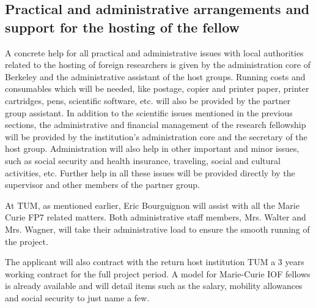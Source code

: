 \subsection{Practical and administrative arrangements and support for the hosting of the fellow 
} 
A concrete help for all practical and administrative issues with local authorities related to 
the hosting of foreign researchers is given by the administration core of Berkeley and the 
administrative assistant of the host groups. Running costs and consumables which will be needed, like 
postage, copier and printer paper, printer cartridges, pens, scientific software, etc. will 
also be provided by the partner group assistant. 
In addition to the scientific issues mentioned in the previous sections, the administrative 
and financial management of the research fellowship will be provided by the institution's 
administration core and the secretary of the host group. Administration will also help in 
other important and minor issues, such as social security and health insurance, traveling, 
social and cultural activities, etc. Further help in all these issues will be provided directly 
by the supervisor and other members of the partner group.

At TUM, as mentioned earlier, Eric Bourguignon  will assist with all the
Marie Curie FP7 related matters. Both  administrative staff members, Mrs. Walter and
Mrs. Wagner, will take their administrative load  to ensure the smooth running of the
project.

The applicant will also contract with the return host institution TUM a 3 years working 
contract for the full project period. A model for Marie-Curie IOF fellows is already available 
and will detail items such as the salary, mobility allowances and social security to just name a few.
\newpage
